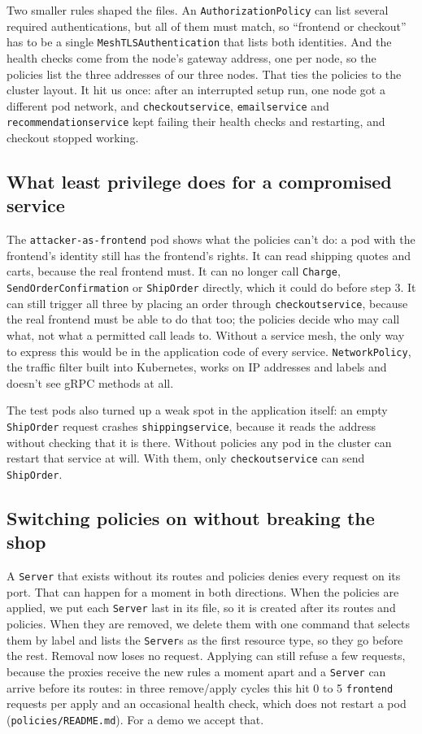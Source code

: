 \documentclass[12pt,a4paper]{article}
\begin{document}
Two smaller rules shaped the files. An \texttt{AuthorizationPolicy} can list
several required authentications, but all of them must match, so ``frontend
or checkout'' has to be a single \texttt{MeshTLSAuthentication} that lists
both identities. And the health checks come from the node's gateway address,
one per node, so the policies list the three addresses of our three nodes.
That ties the policies to the cluster layout. It hit us once: after an
interrupted setup run, one node got a different pod network, and
\texttt{checkoutservice}, \texttt{emailservice} and
\texttt{recommendationservice} kept failing their health checks and
restarting, and checkout stopped working.

\subsection*{What least privilege does for a compromised service}

The \texttt{attacker-as-frontend} pod shows what the policies can't do: a pod
with the frontend's identity still has the frontend's rights. It can read
shipping quotes and carts, because the real frontend must. It can no longer
call \texttt{Charge}, \texttt{SendOrderConfirmation} or \texttt{ShipOrder}
directly, which it could do before step 3. It can still trigger all three by
placing an order through \texttt{checkoutservice}, because the real frontend
must be able to do that too; the policies decide who may call what, not what
a permitted call leads to. Without a service mesh, the only way to express this would be in the
application code of every service. \texttt{NetworkPolicy}, the traffic filter
built into Kubernetes, works on IP addresses and labels and doesn't see gRPC
methods at all.

The test pods also turned up a weak spot in the application itself: an empty
\texttt{ShipOrder} request crashes \texttt{shippingservice}, because it reads
the address without checking that it is there. Without policies any pod in the
cluster can restart that service at will. With them, only
\texttt{checkoutservice} can send \texttt{ShipOrder}.

\subsection*{Switching policies on without breaking the shop}

A \texttt{Server} that exists without its routes and policies denies every
request on its port. That can happen for a moment in both directions. When
the policies are applied, we put each \texttt{Server} last in its file, so it
is created after its routes and policies. When they are removed, we delete
them with one command that selects them by label and lists the
\texttt{Server}s as the first resource type, so they go before the rest.
Removal now loses no request. Applying can still refuse a few requests,
because the proxies receive the new rules a moment apart and a
\texttt{Server} can arrive before its routes: in three remove/apply cycles
this hit 0 to 5 \texttt{frontend} requests per apply and an occasional
health check, which does not restart a pod (\texttt{policies/README.md}).
For a demo we accept that.
\end{document}
